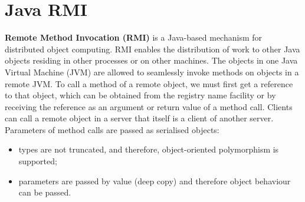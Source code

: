 \documentclass[a4paper,11pt]{article}
\begin{document}
\section{Java RMI}
\textbf{Remote Method Invocation (RMI)} is a Java-based mechanism for distributed object computing.
RMI enables the distribution of work to other Java objects residing in other processes or on other machines.
The objects in one Java Virtual Machine (JVM) are allowed to seamlessly invoke methods on objects in a remote JVM.
To call a method of a remote object, we must first get a reference to that object, which can be obtained from  the registry name facility or by receiving the reference as an argument or return value of a method call.
Clients can call a remote object in a server that itself is a client of another server.
Parameters of method calls are passed as serialised objects: 
\begin{itemize}
    \item   types are not truncated, and therefore, object-oriented polymorphism is supported;
    \item   parameters are passed by value (deep copy) and therefore object behaviour can be passed.
\end{itemize}
\end{document}
